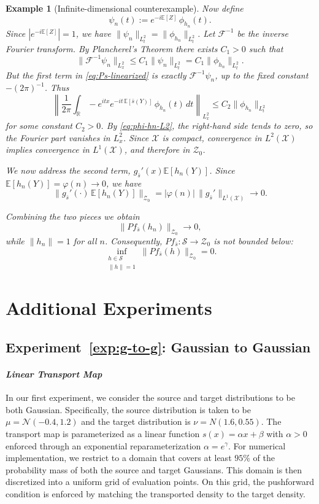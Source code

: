\documentclass[12pt,leqno]{amsart}
\newtheorem{example}{Example}
\newcounter{experiment}
\begin{document}
\begin{example}[Infinite-dimensional counterexample]
Now define
\[
\psi_n(t) := e^{-i\mathbb{E}[Z]}\,\phi_{h_n}(t).
\]
Since $|e^{-i\mathbb{E}[Z]}|=1$, we have
$\|\psi_n\|_{L^2_t} = \|\phi_{h_n}\|_{L^2_t}$. Let $\mathcal{F}^{-1}$
be the inverse Fourier transform.
By Plancherel's Theorem there exists $C_1>0$
such that
\[
\|\mathcal{F}^{-1}\psi_n\|_{L^2_x}
 \le C_1\|\psi_n\|_{L^2_t}
 = C_1\|\phi_{h_n}\|_{L^2_t}.
\]
But the first term in \eqref{eq:Ps-linearized} is exactly
$\mathcal{F}^{-1}\psi_n$, up to the fixed constant $-(2\pi)^{-1}$.
Thus
\[
\left\|\frac{1}{2\pi}\int_{\mathbb{R}} -e^{itx}e^{-it\,\mathbb{E}[\bar{s}(Y)]}\,
  \phi_{h_n}(t)\,dt \right\|_{L^2_x}
 \le C_2\|\phi_{h_n}\|_{L^2_t}
\]
for some constant $C_2>0$. By \eqref{eq:phi-hn-L2}, the right-hand side tends
to zero, so the Fourier part vanishes in $L^2_x$. Since $\mathcal{X}$ is compact, convergence in $L^2(\mathcal{X})$ implies convergence in $L^1(\mathcal{X})$, and therefore in $\mathcal{Z}_0$.

We now address the second term, $g_{\bar{s}}'(x)\mathbb{E}[h_n(Y)]$. Since $\mathbb{E}[h_n(Y)] = \varphi(n)\longrightarrow 0$,
we have
\[
\|g_{\bar{s}}'(\cdot)\,\mathbb{E}[h_n(Y)]\|_{\mathcal{Z}_0}
 = |\varphi(n)|\,\|g_{\bar{s}}'\|_{L^1(\mathcal{X})} \longrightarrow 0.
\]

Combining the two pieces we obtain
\[
\|Pf_{\bar{s}}(h_n)\|_{\mathcal{Z}_0} \longrightarrow 0,
\]
while $\|h_n\|=1$ for all $n$.
Consequently, $Pf_{\bar{s}}:\mathcal{S}\to \mathcal{Z}_0$ is
not bounded below:
\[
\inf_{\substack{h\in\mathcal{S} \\ \|h\|=1}} \|Pf_{\bar{s}}(h)\|_{\mathcal{Z}_0} = 0.
\]
\end{example}

\section{Additional Experiments}
\label{exp:g-to-g}
\subsection*{Experiment~\ref{exp:g-to-g}: Gaussian to Gaussian}
\paragraph{\it Linear Transport Map}
In our first experiment, we consider the source and target distributions to be both Gaussian. Specifically, the source distribution is taken to be $\mu =\mathcal{N}(-0.4, 1.2)$ and the target distribution is $\mathcal{\nu} = N(1.6, 0.55)$. The transport map is parameterized as a linear function $s(x) = \alpha x + \beta$ with $\alpha > 0$ enforced through an exponential reparameterization $\alpha = e^\gamma$. For numerical implementation, we restrict to a domain that covers at least $95\%$ of the probability mass of both the source and target Gaussians. This domain is then discretized into a uniform grid of evaluation points. On this grid, the pushforward condition is enforced by matching the transported density to the target density.
\end{document}
